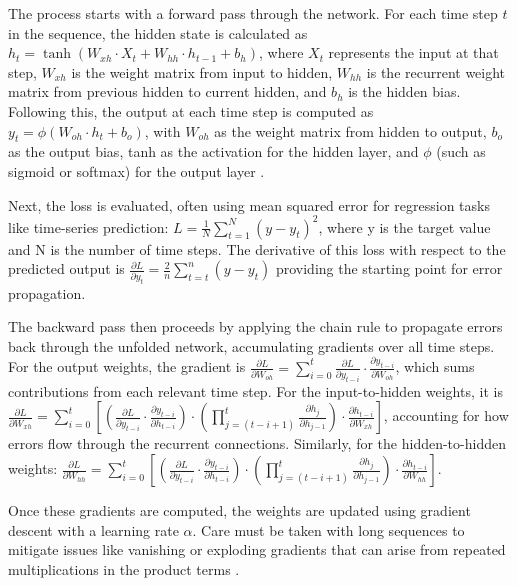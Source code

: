 \documentclass[conference, 10pt]{IEEEtran}
\begin{document}
The process starts with a forward pass through the network. For each time step $t$ in the sequence, the hidden state is
calculated as \( h_t = \tanh(W_{xh} \cdot X_t + W_{hh} \cdot h_{t-1} + b_h) \), where \( X_t \) represents the input at
that step, \( W_{xh} \) is the weight matrix from input to hidden, \( W_{hh} \) is the recurrent weight matrix from
previous hidden to current hidden, and \( b_h \) is the hidden bias. Following this, the output at each time step is
computed as \( y_t = \phi(W_{oh} \cdot h_t + b_o) \), with \( W_{oh} \) as the weight matrix from hidden to output, \(
b_o \) as the output bias, tanh as the activation for the hidden layer, and \( \phi \) (such as sigmoid or softmax) for
the output layer \cite{quarkmlBackpropagationThrough}.

Next, the loss is evaluated, often using mean squared error for regression tasks like time-series prediction: \( L =
\frac{1}{N} \sum_{t=1}^{N} (y - y_t)^2 \), where y is the target value and N is the number of time steps. The derivative
of this loss with respect to the predicted output is \( \frac{\partial{L}}{\partial{y_t}} = \frac{2}{n}\sum_{t=t}^{n}(y
- y_t) \) providing the starting point for error propagation.

The backward pass then proceeds by applying the chain rule to propagate errors back through the unfolded network,
accumulating gradients over all time steps. For the output weights, the gradient is \( \frac{\partial L}{\partial
W_{oh}} = \sum_{i=0}^{t} \frac{\partial L}{\partial y_{t-i}} \cdot \frac{\partial y_{t-i}}{\partial W_{oh}} \), which
sums contributions from each relevant time step. For the input-to-hidden weights, it is \( \frac{\partial L}{\partial
W_{xh}} = \sum_{i=0}^{t} \left[ \left( \frac{\partial L}{\partial y_{t-i}} \cdot \frac{\partial y_{t-i}}{\partial
h_{t-i}} \right) \cdot \left( \prod_{j=(t-i+1)}^{t} \frac{\partial h_j}{\partial h_{j-1}} \right) \cdot \frac{\partial
h_{t-i}}{\partial W_{xh}} \right] \), accounting for how errors flow through the recurrent connections. Similarly, for
the hidden-to-hidden weights: \( \frac{\partial L}{\partial W_{hh}} = \sum_{i=0}^{t} \left[ \left( \frac{\partial
L}{\partial y_{t-i}} \cdot \frac{\partial y_{t-i}}{\partial h_{t-i}} \right) \cdot \left( \prod_{j=(t-i+1)}^{t}
\frac{\partial h_j}{\partial h_{j-1}} \right) \cdot \frac{\partial h_{t-i}}{\partial W_{hh}} \right] \). 

Once these gradients are computed, the weights are updated using gradient descent with a learning rate \( \alpha \).
Care must be taken with long sequences to mitigate issues like vanishing or exploding gradients that can arise from
repeated multiplications in the product terms \cite{quarkmlBackpropagationThrough}.
\end{document}
